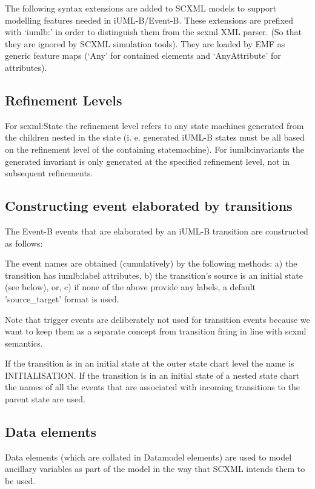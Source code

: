 \documentclass{easychair}
\begin{document}
The following syntax extensions are added to SCXML models 
to support modelling features needed in iUML-B/Event-B. 
These extensions are prefixed with ‘iumlb:’ in order to 
distinguish them from the scxml XML parser. (So that they 
are ignored by SCXML simulation tools). They are loaded by 
EMF as generic feature maps (‘Any’ for contained elements 
and ‘AnyAttribute’ for attributes).


\subsection{Refinement Levels}
For scxml:State the refinement level refers to any state 
machines generated from the children nested in the state (i.
e. generated iUML-B states must be all based on the 
refinement level of the containing statemachine).
For iumlb:invariants the generated invariant is only 
generated at the specified refinement level, not in 
subsequent refinements.

\subsection{Constructing event elaborated by transitions}
The Event-B events that are elaborated by an iUML-B 
transition are constructed as follows:

The event names are obtained (cumulatively) by the 
following methods:
a)  the transition has iumlb:label attributes,
b) the transition's source is an initial state (see below), 
or,
c) if none of the above provide any labels, a default 
'source\_target' format is used.

Note that trigger events are deliberately not used for 
transition events because we want to keep them as a 
separate concept from transition firing in line with scxml 
semantics.

If the transition is in an initial state at the outer state 
chart level the name is INITIALISATION. 
If the transition is in an initial state of a nested state 
chart the names of all the events that are associated with 
incoming transitions to the parent state are used.

\subsection{Data elements}
Data elements (which are collated in Datamodel elements) 
are used to model ancillary variables as part of the model 
in the way that SCXML intends them to be used.
\end{document}
